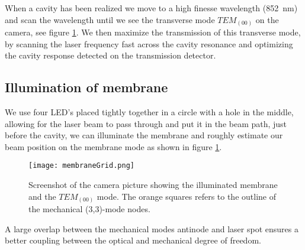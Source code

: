 When a cavity has been realized we move to a high finesse wavelength (\SI{852}{\nano\meter}) and scan the wavelength until we see the transverse mode $TEM_{(00)}$ on the camera, see figure \ref{fig:beam_place}. We then maximize the transmission of this transverse mode, by scanning the laser frequency fast across the cavity resonance and optimizing the cavity response detected on the transmission detector.

\subsection{Illumination of membrane}
We use four LED's placed tightly together in a circle with a hole in the middle, allowing for the laser beam to pass through and put it in the beam path, just before the cavity, we can illuminate the membrane and roughly estimate our beam position on the membrane mode as shown in figure \ref{fig:beam_place}.

\begin{figure}[H]
\centering
\texttt{[image: membraneGrid.png]}
\caption{Screenshot of the camera picture showing the illuminated membrane and the $TEM_{(00)}$ mode. The orange squares refers to the outline of the mechanical (3,3)-mode nodes.}
\label{fig:beam_place}
\end{figure}

A large overlap between the mechanical modes antinode and laser spot ensures a better coupling between the optical and mechanical degree of freedom.